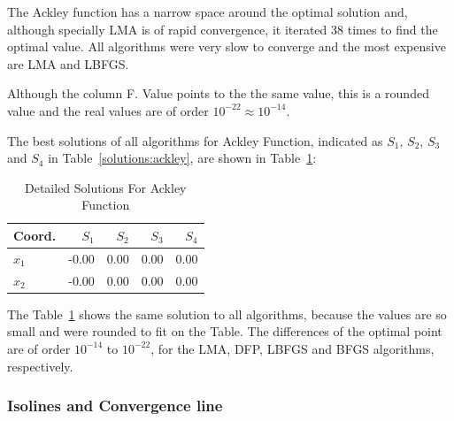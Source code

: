 \documentclass[conference]{IEEEtran}
\begin{document}
The Ackley function has a narrow space around the optimal solution and,
although specially LMA is of rapid convergence, it iterated 38 times to find
the optimal value. All algorithms were very slow to converge and the most expensive
are LMA and LBFGS.

Although the column F. Value points to the the same value, this is a rounded value
and the real values are of order $10^{-22} \approx 10^{-14}$.



The best solutions of all algorithms for Ackley Function, indicated as
$S_{1}$, $S_{2}$, $S_{3}$ and $S_{4}$ in Table~\ref{solutions:ackley}, are shown
in Table~\ref{detailedsolutions:ackley}:

\begin{table}[H]
\centering
\caption{Detailed Solutions For Ackley Function}
\label{detailedsolutions:ackley}
\begin{tabular}{lrrrr}
\toprule
 Coord. &  $S_{1}$ &  $S_{2}$ &  $S_{3}$ &  $S_{4}$ \\
\midrule
$x_{1}$ &    -0.00 &     0.00 &     0.00 &     0.00 \\
$x_{2}$ &    -0.00 &     0.00 &     0.00 &     0.00 \\
\bottomrule
\end{tabular}
\end{table}

The Table~\ref{detailedsolutions:ackley} shows the same solution to all algorithms, because the values are so small
and were rounded to fit on the Table. The differences of the optimal point are of order $10^{-14}$ to $10^{-22}$,
for the LMA, DFP, LBFGS and BFGS algorithms, respectively.


\subsubsection{Isolines and Convergence line}
\label{isolinesackley2D}
\end{document}
